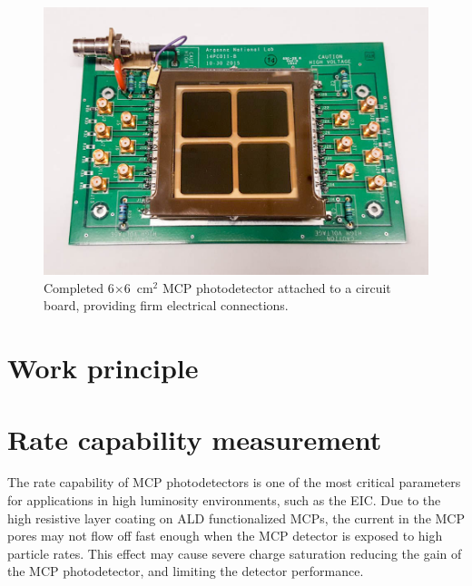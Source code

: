 \documentclass[preprint,5p]{elsarticle}
\begin{document}
\begin{figure}[tbp]
\centering 
\includegraphics[scale=0.23]{fig/MCPs_assembly.png}
\caption{Completed 6$\times$6~cm$^2$ MCP photodetector attached to a circuit 
board, providing firm electrical connections.} \label{fig:MCP_assm}
\end{figure}

\section{Work principle}


\section{Rate capability measurement} \label{sec_proton_measurements}
The rate capability of MCP photodetectors is one of the most critical 
parameters for applications in high luminosity environments, such as the EIC.  
Due to the high resistive layer coating on ALD functionalized MCPs, the current 
in the MCP pores may not flow off fast enough when the MCP detector is exposed 
to high particle rates. This effect may cause severe charge saturation reducing 
the gain of the MCP photodetector, and limiting the detector performance. 
 
\end{document}
